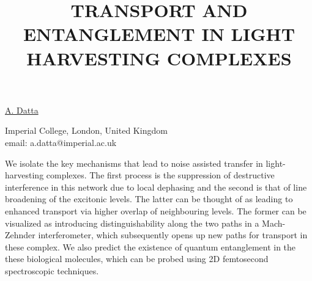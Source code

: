 \title{TRANSPORT AND ENTANGLEMENT IN LIGHT HARVESTING COMPLEXES}

\underline{A. Datta}


Imperial College, London, United Kingdom\\
email: a.datta@imperial.ac.uk

We isolate the key mechanisms that lead to noise assisted transfer in
light-harvesting complexes. The first process
is the suppression of destructive interference in this network due to
local dephasing and the second is that of line
broadening of the excitonic levels. The latter can be thought of as
leading to enhanced transport via higher overlap
of neighbouring levels. The former can be visualized as introducing
distinguishability along the two paths in a
Mach-Zehnder interferometer, which subsequently opens up new paths for
transport in these complex. We also predict
the existence of quantum entanglement in the these biological molecules,
which can be probed using 2D femtosecond spectroscopic techniques.

\vspace{\baselineskip}